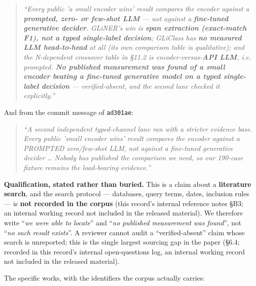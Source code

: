 \documentclass[11pt,a4paper]{article}
\begin{document}
\begin{quote}
\emph{``Every public 'a small encoder wins' result compares the encoder against a \textbf{prompted, zero- or few-shot LLM} --- not against a \textbf{fine-tuned generative decider}. GLiNER's win is \textbf{span extraction (exact-match F1), not a typed single-label decision}; GLiClass has \textbf{no measured LLM head-to-head} at all (its own comparison table is qualitative); and the N-dependent crossover table in \S11.2 is encoder-versus-\textbf{API LLM}, i.e. prompted. \textbf{No published measurement was found of a small encoder beating a fine-tuned generative model on a typed single-label decision} --- verified-absent, and the second lane checked it explicitly.''}
\end{quote}

And from the commit message of \texttt{ad301ae}:

\begin{quote}
\emph{``A second independent typed-channel lane ran with a stricter evidence base. Every public 'small encoder wins' result compares the encoder against a PROMPTED zero/few-shot LLM, not against a fine-tuned generative decider \ldots{} Nobody has published the comparison we need, so our 190-case fixture remains the load-bearing evidence.''}
\end{quote}

\textbf{Qualification, stated rather than buried.} This is a claim about a \textbf{literature search}, and the search protocol --- databases, query terms, dates, inclusion rules --- is \textbf{not recorded in the corpus} (this record's internal reference notes \S{}B3; an internal working record not included in the released material). We therefore write ``\emph{we were able to locate}'' and ``\emph{no published measurement was found}'', not ``\emph{no such result exists}''. A reviewer cannot audit a ``verified-absent'' claim whose search is unreported; this is the single largest sourcing gap in the paper (\S6.4; recorded in this record's internal open-questions log, an internal working record not included in the released material).

The specific works, with the identifiers the corpus actually carries:
\end{document}

